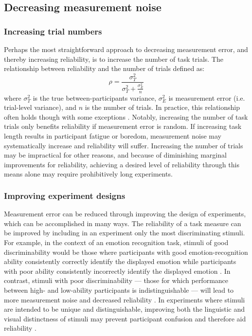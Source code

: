 \documentclass[a4paper,12pt]{article}
\begin{document}
\subsection{Decreasing measurement noise}

\subsubsection{Increasing trial numbers}

Perhaps the most straightforward approach to decreasing measurement error, and thereby increasing reliability, is to increase the number of task trials. The relationship between reliability and the number of trials defined as:
\begin{equation}
    \rho = \frac{\sigma^2_T}{\sigma^2_T + \frac{\sigma^2_E}{n}}
\end{equation}
where $\sigma^2_T$ is the true between-participants variance, $\sigma^2_E$ is measurement error (i.e. trial-level variance), and $n$ is the number of trials. In practice, this relationship often holds \cite{paap2016role, cooper2017role} though with some exceptions \cite{price2015empirical, klingelhoefer2022robust}. Notably, increasing the number of task trials only benefits reliability if measurement error is random. If increasing task length results in participant fatigue or boredom, measurement noise may systematically increase and reliability will suffer. Increasing the number of trials may be impractical for other reasons, and because of diminishing marginal improvements for reliability, achieving a desired level of reliability through this means alone may require prohibitively long experiments.

\subsubsection{Improving experiment designs}

Measurement error can be reduced through improving the design of experiments, which can be accomplished in many ways. The reliability of a task measure can be improved by including in an experiment only the most discriminating stimuli. For example, in the context of an emotion recognition task, stimuli of good discriminability would be those where participants with good emotion-recognition ability consistently correctly identify the displayed emotion while participants with poor ability consistently incorrectly identify the displayed emotion \cite{keutmann2015generating}. In contrast, stimuli with poor discriminability --- those for which performance between high- and low-ability participants is indistinguishable --- will lead to more measurement noise and decreased reliability \cite{embretson2013item}. In experiments where stimuli are intended to be unique and distinguishable, improving both the linguistic and visual distinctness of stimuli may prevent participant confusion and therefore aid reliability \cite{yoo2022importance}.  
\end{document}
